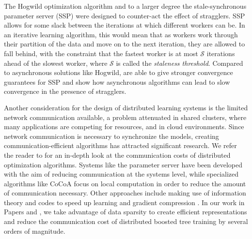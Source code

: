 The Hogwild optimization algorithm \cite{hogwild} and to a larger degree the stale-synchronous
parameter server (SSP) \cite{stale-sync-ps} were designed to counter-act the effect of stragglers.
SSP allows for some slack between the iterations at which different workers can be. In an iterative learning algorithm, this would mean that as workers work through their partition of the data and move
on to the next iteration, they are allowed to fall behind, with the constraint that the fastest worker is at most
$\mathcal{S}$ iterations ahead of the slowest worker, where $\mathcal{S}$ is called the \emph{staleness threshold}.
Compared to asynchronous solutions like Hogwild, \citet{stale-sync-ps} are able to give stronger convergence
guarantees for SSP and show how asynchronous algorithms can lead to slow convergence in the presence of stragglers.

Another consideration for the design of distributed learning systems is the
limited network communication available, a problem attenuated in shared clusters,
where many applications are competing for resources, and in cloud environments.
Since network communication is necessary to synchronize the models, creating
communication-efficient algorithms has attracted significant research.
We refer the reader to \citet{optimization-communication-complexity} for an in-depth
look at the communication costs of distributed optimization algorithms.
Systems like the parameter server have been developed with the aim of reducing communication \cite{muPS}
at the systems level,
while specialized algorithms like CoCoA \cite{cocoa} focus on local computation
in order to reduce the amount of communication necessary. Other approaches include making use
of information theory and codes to speed up learning \cite{distributed-ml-codes} and gradient
compression \cite{gradient-compression}.
In our work in Papers \boostvhtNum and \blockgbtNum,
we take advantage of data sparsity to create efficient representations
and reduce the communication cost of distributed boosted tree training by several orders
of magnitude.
